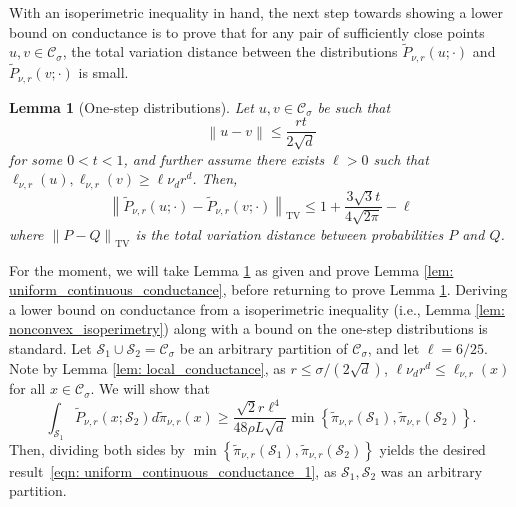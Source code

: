 \documentclass[11pt,twoside]{article}
\newtheorem{lemma}{Lemma}
\theoremstyle{definition}
\newcommand{\set}[1]{\left\{#1\right\}}
\newcommand{\norm}[1]{\left\lVert#1\right\rVert}
\newcommand{\1}{\mathbbm{1}}
\newcommand{\Sset}{\mathcal{S}}
\newcommand{\Cset}{\mathcal{C}}
\newcommand{\Csig}{\Cset_{\sigma}}
\begin{document}
With an isoperimetric inequality in hand, the next step towards showing a lower bound on conductance is to prove that for any pair of sufficiently close points $u,v \in \Csig$, the total variation distance between the distributions $\widetilde{P}_{\nu,r}(u;\cdot)$ and $\widetilde{P}_{\nu,r}(v;\cdot)$ is small. 
\begin{lemma}[One-step distributions]
	\label{lem: one_step_distributions}
	Let $u,v \in \Csig$ be such that 
	\begin{equation*}
	\norm{u - v} \leq \frac{r t}{2\sqrt{d}}
	\end{equation*}
	for some $0 < t < 1$, and further assume there exists $\ell > 0$ such that $\ell_{\nu,r}(u), \ell_{\nu,r}(v) \geq \ell \nu_d r^d$. Then,
	\begin{equation*}
	\norm{\widetilde{P}_{\nu,r}(u; \cdot) - \widetilde{P}_{\nu,r}(v; \cdot)}_{\mathrm{TV}} \leq 1 + \frac{3 \sqrt{3} t}{4\sqrt{2\pi}} - \ell
	\end{equation*}
	where $\norm{P - Q}_{\mathrm{TV}}$ is the total variation distance between probabilities $P$ and $Q$. 
\end{lemma}
For the moment, we will take Lemma \ref{lem: one_step_distributions} as given and prove Lemma \ref{lem: uniform_continuous_conductance}, before returning to prove Lemma \ref{lem: one_step_distributions}. Deriving a lower bound on conductance from a isoperimetric inequality (i.e., Lemma \ref{lem: nonconvex_isoperimetry}) along with a bound on the one-step distributions is standard. Let $\Sset_1 \cup \Sset_2 = \Csig$ be an arbitrary partition of $\Csig$, and let $\ell = 6/25$. Note by Lemma \ref{lem: local_conductance}, as $r \leq \sigma/(2\sqrt{d})$, $\ell \nu_d r^d  \leq \ell_{\nu,r}(x)$ for all $x \in \Csig$. We will show that 
\begin{equation}
\label{eqn: uniform_continuous_conductance_1}
\int_{\Sset_1} \widetilde{P}_{\nu,r}(x; \Sset_2) d \widetilde{\pi}_{\nu,r}(x) \geq \frac{\sqrt{2} r \ell^4}{48 \rho L \sqrt{d}} \min\set{\widetilde{\pi}_{\nu,r}(\Sset_1), \widetilde{\pi}_{\nu,r}(\Sset_2)}.
\end{equation}
Then, dividing both sides by $\min\set{\widetilde{\pi}_{\nu,r}(\Sset_1), \widetilde{\pi}_{\nu,r}(\Sset_2)}$ yields the desired result~\eqref{eqn: uniform_continuous_conductance_1}, as $\Sset_1,\Sset_2$ was an arbitrary partition.
\end{document}
